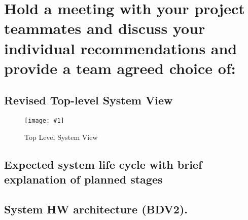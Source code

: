 \documentclass[12pt]{article}
\newcommand\createfigure[2]{
\begin{figure}[H]
  \centering
  \texttt{[image: \#1]}
  \caption{#2}
\end{figure}}
\begin{document}
\linespread{2.0}
\section{Hold a meeting with your project teammates and discuss your individual recommendations and provide a team agreed choice of:}
\subsection{Revised Top-level System View}
\createfigure{../Figures/global-system-view.png}{Top Level System View}
\subsection{Expected system life cycle with brief explanation of planned stages}
\subsection{System HW architecture (BDV2). }
\end{document}
